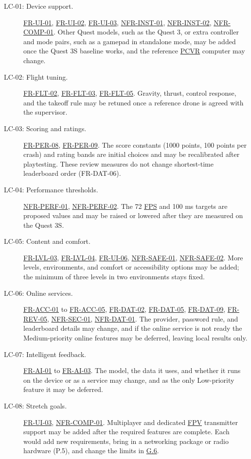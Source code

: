 \documentclass[12pt]{article}
\begin{document}
\begin{description}
\item[LC-01: Device support.]
\hyperlink{req:FR-UI-01}{FR-UI-01}, \hyperlink{req:FR-UI-02}{FR-UI-02},
\hyperlink{req:FR-UI-03}{FR-UI-03}, \hyperlink{req:NFR-INST-01}{NFR-INST-01},
\hyperlink{req:NFR-INST-02}{NFR-INST-02},
\hyperlink{req:NFR-COMP-01}{NFR-COMP-01}.
Other Quest models, such as the Quest 3, or extra controller and mode pairs,
such as a gamepad in standalone mode, may be added once the Quest 3S baseline
works, and the reference \hyperlink{glos:PCVR}{PCVR} computer may change.
\item[LC-02: Flight tuning.]
\hyperlink{req:FR-FLT-02}{FR-FLT-02}, \hyperlink{req:FR-FLT-03}{FR-FLT-03},
\hyperlink{req:FR-FLT-05}{FR-FLT-05}.
Gravity, thrust, control response, and the takeoff rule may be retuned once a
reference drone is agreed with the supervisor.
\item[LC-03: Scoring and ratings.]
\hyperlink{req:FR-PER-08}{FR-PER-08}, \hyperlink{req:FR-PER-09}{FR-PER-09}.
The score constants (1000 points, 100 points per crash) and rating bands are
initial choices and may be recalibrated after playtesting. These review
measures do not change shortest-time leaderboard order (FR-DAT-06).
\item[LC-04: Performance thresholds.]
\hyperlink{req:NFR-PERF-01}{NFR-PERF-01},
\hyperlink{req:NFR-PERF-02}{NFR-PERF-02}.
The 72 \hyperlink{glos:FPS}{FPS} and 100 ms targets are proposed values and may be raised or
lowered after they are measured on the Quest 3S.
\item[LC-05: Content and comfort.]
\hyperlink{req:FR-LVL-03}{FR-LVL-03}, \hyperlink{req:FR-LVL-04}{FR-LVL-04},
\hyperlink{req:FR-UI-06}{FR-UI-06}, \hyperlink{req:NFR-SAFE-01}{NFR-SAFE-01},
\hyperlink{req:NFR-SAFE-02}{NFR-SAFE-02}.
More levels, environments, and comfort or accessibility options may be added;
the minimum of three levels in two environments stays fixed.
\item[LC-06: Online services.]
\hyperlink{req:FR-ACC-01}{FR-ACC-01} to \hyperlink{req:FR-ACC-05}{FR-ACC-05},
\hyperlink{req:FR-DAT-02}{FR-DAT-02}, \hyperlink{req:FR-DAT-05}{FR-DAT-05},
\hyperlink{req:FR-DAT-09}{FR-DAT-09}, \hyperlink{req:FR-REV-05}{FR-REV-05},
\hyperlink{req:NFR-SEC-01}{NFR-SEC-01}, \hyperlink{req:NFR-DAT-01}{NFR-DAT-01}.
The provider, password rule, and leaderboard details may change, and if the
online service is not ready the Medium-priority online features may be
deferred, leaving local results only.
\item[LC-07: Intelligent feedback.]
\hyperlink{req:FR-AI-01}{FR-AI-01} to \hyperlink{req:FR-AI-03}{FR-AI-03}.
The model, the data it uses, and whether it runs on the device or as a service
may change, and as the only Low-priority feature it may be deferred.
\item[LC-08: Stretch goals.]
\hyperlink{req:FR-UI-03}{FR-UI-03}, \hyperlink{req:NFR-COMP-01}{NFR-COMP-01}.
Multiplayer and dedicated \hyperlink{glos:FPV}{FPV} transmitter support may be added after the
required features are complete. Each would add new requirements, bring in a
networking package or radio hardware (P.5), and change the limits in
\hyperref[g6]{G.6}.
\end{description}
\end{document}
